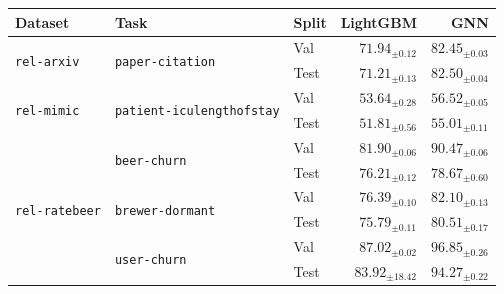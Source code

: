 \begin{tabular}{lllrr}
\toprule
Dataset & Task & Split & LightGBM & GNN \\
\midrule
\multirow[c]{2}{*}{\texttt{rel-arxiv}} & \multirow[c]{2}{*}{\texttt{paper-citation}} & Val & $71.94_{\pm 0.12}$ & $\bm{82.45}_{\pm 0.03}$ \\
 &  & Test & $71.21_{\pm 0.13}$ & $\bm{82.50}_{\pm 0.04}$ \\
\cmidrule{1-5} \cmidrule{2-5}
\multirow[c]{2}{*}{\texttt{rel-mimic}} & \multirow[c]{2}{*}{\texttt{patient-iculengthofstay}} & Val & $53.64_{\pm 0.28}$ & $\bm{56.52}_{\pm 0.05}$ \\
 &  & Test & $51.81_{\pm 0.56}$ & $\bm{55.01}_{\pm 0.11}$ \\
\cmidrule{1-5} \cmidrule{2-5}
\multirow[c]{6}{*}{\texttt{rel-ratebeer}} & \multirow[c]{2}{*}{\texttt{beer-churn}} & Val & $81.90_{\pm 0.06}$ & $\bm{90.47}_{\pm 0.06}$ \\
 &  & Test & $76.21_{\pm 0.12}$ & $\bm{78.67}_{\pm 0.60}$ \\
\cmidrule{2-5}
 & \multirow[c]{2}{*}{\texttt{brewer-dormant}} & Val & $76.39_{\pm 0.10}$ & $\bm{82.10}_{\pm 0.13}$ \\
 &  & Test & $75.79_{\pm 0.11}$ & $\bm{80.51}_{\pm 0.17}$ \\
\cmidrule{2-5}
 & \multirow[c]{2}{*}{\texttt{user-churn}} & Val & $87.02_{\pm 0.02}$ & $\bm{96.85}_{\pm 0.26}$ \\
 &  & Test & $83.92_{\pm 18.42}$ & $\bm{94.27}_{\pm 0.22}$ \\
\bottomrule
\end{tabular}
